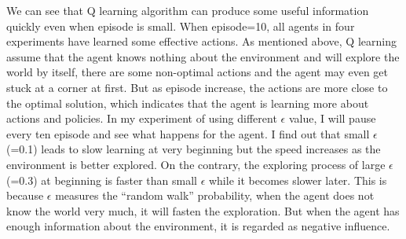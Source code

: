 \documentclass[11pt]{article}
\begin{document}
We can see that Q learning algorithm can produce some useful information quickly even when episode is small. When episode=10, all agents in four experiments have learned some effective actions. As mentioned above, Q learning assume that the agent knows nothing about the environment and will explore the world by itself, there are some non-optimal actions and the agent may even get stuck at a corner at first. But as episode increase, the actions are more close to the optimal solution, which indicates that the agent is learning more about actions and policies. In my experiment of using different $\epsilon$ value, I will pause every ten episode and see what happens for the agent. I find out that small $\epsilon$(=0.1) leads to slow learning at very beginning but the speed increases as the environment is better explored. On the contrary, the exploring process of large $\epsilon$(=0.3) at beginning is faster than small $\epsilon$ while it becomes slower later. This is because $\epsilon$ measures the ``random walk'' probability, when the agent does not know the world very much, it will fasten the exploration. But when the agent has enough information about the environment, it is regarded as  negative influence.
\end{document}

